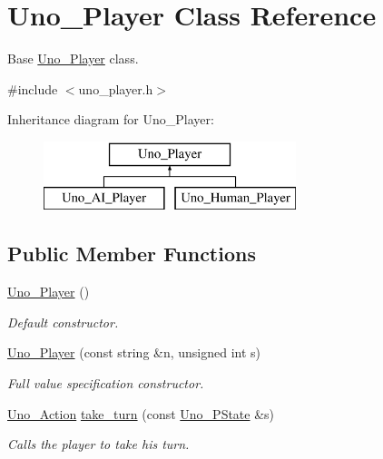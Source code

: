 \hypertarget{class_uno___player}{
\section{\-Uno\-\_\-\-Player \-Class \-Reference}
\label{class_uno___player}
}


\-Base \hyperlink{class_uno___player}{\-Uno\-\_\-\-Player} class.  




{\ttfamily \#include $<$uno\-\_\-player.\-h$>$}

\-Inheritance diagram for \-Uno\-\_\-\-Player\-:\begin{figure}[H]
\begin{center}
\leavevmode
\includegraphics[height=2.000000cm]{class_uno___player}
\end{center}
\end{figure}
\subsection*{\-Public \-Member \-Functions}
\begin{DoxyCompactItemize}
\item 
\hyperlink{class_uno___player_a0447ff92b80be8d98d0052d7d2a868d7}{\-Uno\-\_\-\-Player} ()
\begin{DoxyCompactList}\small\item\em \-Default constructor. \end{DoxyCompactList}\item 
\hyperlink{class_uno___player_a01b27e59f1de1e13627c2e72e69c65c6}{\-Uno\-\_\-\-Player} (const string \&n, unsigned int s)
\begin{DoxyCompactList}\small\item\em \-Full value specification constructor. \end{DoxyCompactList}\item 
\hyperlink{class_uno___action}{\-Uno\-\_\-\-Action} \hyperlink{class_uno___player_aa6e4a3177c39ee2572250b2dd4400a43}{take\-\_\-turn} (const \hyperlink{class_uno___p_state}{\-Uno\-\_\-\-P\-State} \&s)
\begin{DoxyCompactList}\small\item\em \-Calls the player to take his turn. \end{DoxyCompactList}\end{DoxyCompactItemize}
